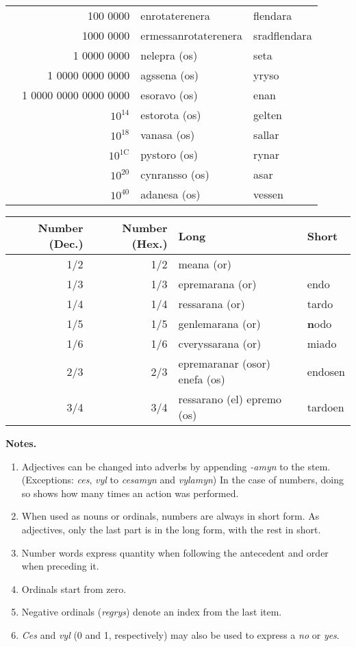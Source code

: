 \begin{center}
\begin{tabular}{|r|r|l|l|}
    & 100 0000 & enrotaterenera & flendara \\
    & 1000 0000 & ermessanrotaterenera & sradflendara \\
    & 1 0000 0000 & nelepra (os) & seta \\
    & 1 0000 0000 0000 & agssena (os) & yryso \\
    & 1 0000 0000 0000 0000 & esoravo (os) & enan \\
    & $10^{14}$ & estorota (os) & gelten \\
    & $10^{18}$ & vanasa (os) & sallar \\
    & $10^{1\text{C}}$ & pystoro (os) & rynar \\
    & $10^{20}$ & cynransso (os) & asar \\
    & $10^{40}$ & adanesa (os) & vessen \\
    \hline
  \end{tabular}
  \begin{tabular}{|r|r|l|l|}
    \hline
    \textbf{Number (Dec.)} & \textbf{Number (Hex.)} & \textbf{Long} & \textbf{Short} \\ \hline
    1/2 & 1/2 & meana (or) & \\
    1/3 & 1/3 & epremarana (or) & endo \\
    1/4 & 1/4 & ressarana (or) & tardo \\
    1/5 & 1/5 & genlemarana (or) & \textbf{n}odo \\
    1/6 & 1/6 & cveryssarana (or) & miado \\
    2/3 & 2/3 & epremaranar (osor) enefa (os) & endosen \\
    3/4 & 3/4 & ressarano (el) epremo (os) & tardoen \\
    \hline
  \end{tabular}
\end{center}

\textbf{Notes.}

\begin{enumerate}
  \item Adjectives can be changed into adverbs by appending \emph{-amyn} to the stem. (Exceptions: \emph{ces}, \emph{vyl} to \emph{cesamyn} and \emph{vylamyn}) In the case of numbers, doing so shows how many times an action was performed.
  \item When used as nouns or ordinals, numbers are always in short form. As adjectives, only the last part is in the long form, with the rest in short.
  \item Number words express quantity when following the antecedent and order when preceding it.
  \item Ordinals start from zero.
  \item Negative ordinals (\emph{regrys}) denote an index from the last item.
  \item \emph{Ces} and \emph{vyl} (0 and 1, respectively) may also be used to express a \emph{no} or \emph{yes}.
\end{enumerate}

